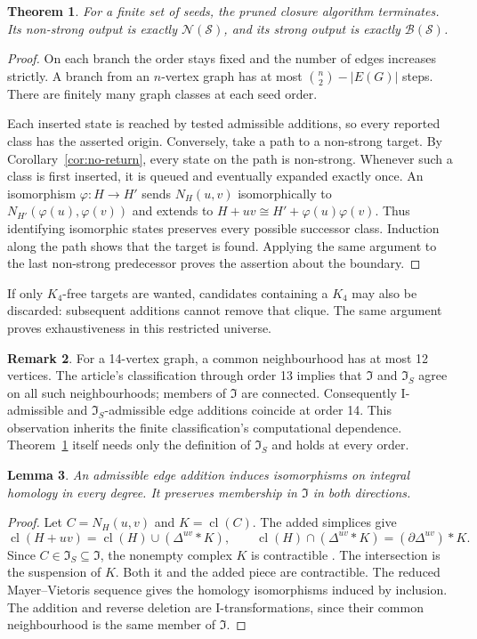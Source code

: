 \documentclass[11pt]{amsart}
\newcommand{\I}{\mathfrak I}
\newcommand{\IS}{\mathfrak I_S}
\newcommand{\cl}{\operatorname{cl}}
\newcommand{\NS}{\mathcal N}
\newcommand{\BS}{\mathcal B}
\newtheorem{theorem}{Theorem}[section]
\newtheorem{lemma}[theorem]{Lemma}
\theoremstyle{definition}
\newtheorem{remark}[theorem]{Remark}
\begin{document}
\begin{theorem}\label{thm:closure}
For a finite set of seeds, the pruned closure algorithm terminates.
Its non-strong output is exactly $\NS(\mathcal S)$, and its strong
output is exactly $\BS(\mathcal S)$.
\end{theorem}
\begin{proof}
On each branch the order stays fixed and the number of edges increases
strictly. A branch from an $n$-vertex graph has at most
$\binom n2-|E(G)|$ steps. There are finitely many graph classes at
each seed order.

Each inserted state is reached by tested admissible additions, so
every reported class has the asserted origin.
Conversely, take a path to a non-strong target.
By Corollary~\ref{cor:no-return}, every state on the path is non-strong.
Whenever such a class is first inserted, it is queued and eventually
expanded exactly once.
An isomorphism $\varphi:H\to H'$ sends $N_H(u,v)$ isomorphically to
$N_{H'}(\varphi(u),\varphi(v))$ and extends to
$H+uv\cong H'+\varphi(u)\varphi(v)$. Thus identifying isomorphic states
preserves every possible successor class. Induction along the path
shows that the target is found. Applying the same argument to the
last non-strong predecessor proves the assertion about the boundary.
\end{proof}

If only $K_4$-free targets are wanted, candidates containing a $K_4$
may also be discarded: subsequent additions cannot remove that clique.
The same argument proves exhaustiveness in this restricted universe.

\begin{remark}
For a 14-vertex graph, a common neighbourhood has at most 12 vertices.
The article's classification through order 13 implies that $\I$ and
$\IS$ agree on all such neighbourhoods; members of $\I$ are connected.
Consequently I-admissible and $\IS$-admissible edge additions coincide
at order 14. This observation inherits the finite classification's
computational dependence. Theorem~\ref{thm:closure} itself needs only
the definition of $\IS$ and holds at every order.
\end{remark}

\begin{lemma}\label{lem:homology}
An admissible edge addition induces isomorphisms on integral homology
in every degree. It preserves membership in $\I$ in both directions.
\end{lemma}
\begin{proof}
Let $C=N_H(u,v)$ and $K=\cl(C)$. The added simplices give
\[
 \cl(H+uv)=\cl(H)\cup(\Delta^{uv}*K),\qquad
 \cl(H)\cap(\Delta^{uv}*K)=(\partial\Delta^{uv})*K.
\]
Since $C\in\IS\subseteq\I$, the nonempty complex $K$ is contractible
\cite{EFH2022,DochtermannMatsushita2025}.
The intersection is the suspension of $K$. Both it and the added
piece are contractible.
The reduced Mayer--Vietoris sequence gives the homology isomorphisms
induced by inclusion. The addition and reverse deletion are
I-transformations, since their common neighbourhood is the same
member of $\I$.
\end{proof}
\end{document}

